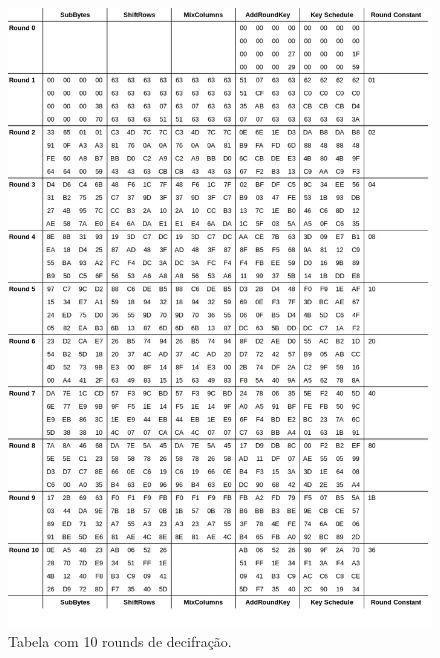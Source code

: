 \documentclass{article}
\begin{document}
\begin{figure}
    \centering
    \includegraphics[width=1\linewidth]{imgs/table_aes_deph.jpg}
    \caption{Tabela com 10 rounds de decifração.}
    \label{fig:tab2}
\end{figure}
\end{document}

